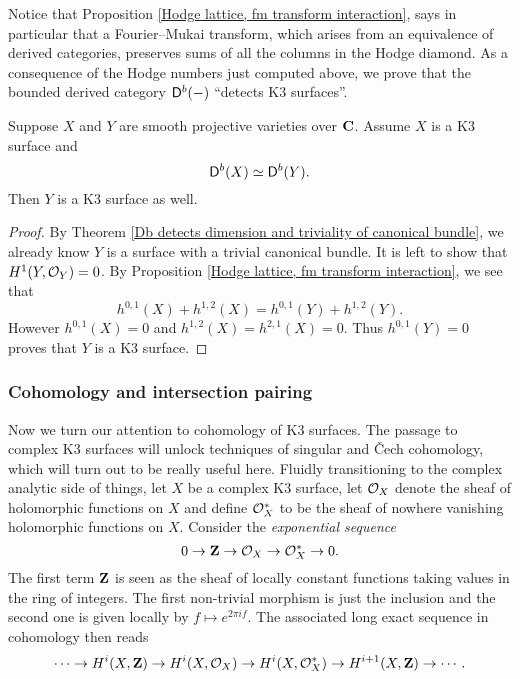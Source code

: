 Notice that Proposition \ref{Hodge lattice, fm transform interaction}, says in particular that a Fourier--Mukai transform, which arises from an equivalence of derived categories, preserves sums of all the columns in the Hodge diamond. As a consequence of the Hodge numbers just computed above, we prove that the bounded derived category $\mathsf{D}^b(-)$ ``detects K3 surfaces''.

\begin{theorem}
    \label{Db(-) detects K3}
    Suppose $X$ and $Y$ are smooth projective varieties over $\mathbf C$. Assume $X$ is a K3 surface and
    \[
        \mathsf{D}^b(X) \simeq \mathsf{D}^b(Y).
    \]
    Then $Y$ is a K3 surface as well. 
\end{theorem}

\begin{proof}
    By Theorem \ref{Db detects dimension and triviality of canonical bundle}, we already know $Y$ is a surface with a trivial canonical bundle. It is left to show that $H^{1}(Y, {\mathcal{O}_{Y}}) = 0$. By Proposition \ref{Hodge lattice, fm transform interaction}, we see that 
    \[
        h^{0,1}(X) + h^{1,2}(X) = h^{0,1}(Y) + h^{1,2}(Y). 
    \]
    However $h^{0,1}(X) = 0$ and $h^{1,2}(X) = h^{2,1}(X) = 0$.
    Thus $h^{0,1}(Y) = 0$ proves that $Y$ is a K3 surface.
\end{proof}

\subsubsection*{Cohomology and intersection pairing}

Now we turn our attention to cohomology of K3 surfaces. The passage to complex K3 surfaces will unlock techniques of singular and Čech cohomology, which will turn out to be really useful here. Fluidly transitioning to the complex analytic side of things, let $X$ be a complex K3 surface, let ${\mathcal{O}_{X}}$ denote the sheaf of holomorphic functions on $X$ and define $\mathcal O_X^*$ to be the sheaf of nowhere vanishing holomorphic functions on $X$. Consider the \emph{exponential sequence}
\[
    0 \to \mathbf Z \to {\mathcal{O}_{X}} \to \mathcal O_X^* \to 0.
\]
The first term $\mathbf Z$ is seen as the sheaf of locally constant functions taking values in the ring of integers. The first non-trivial morphism is just the inclusion and the second one is given locally by $f \mapsto e^{2\pi i f}$. The associated long exact sequence in
cohomology then reads
\begin{equation}
    \label{eq: LES of exponential SES}
    \cdots \to H^{i}(X, \mathbf Z) \to H^{i}(X, {\mathcal{O}_{X}}) \to H^{i}(X, \mathcal O^*_X) \to H^{i+1}(X, \mathbf Z) \to \cdots.
\end{equation}

